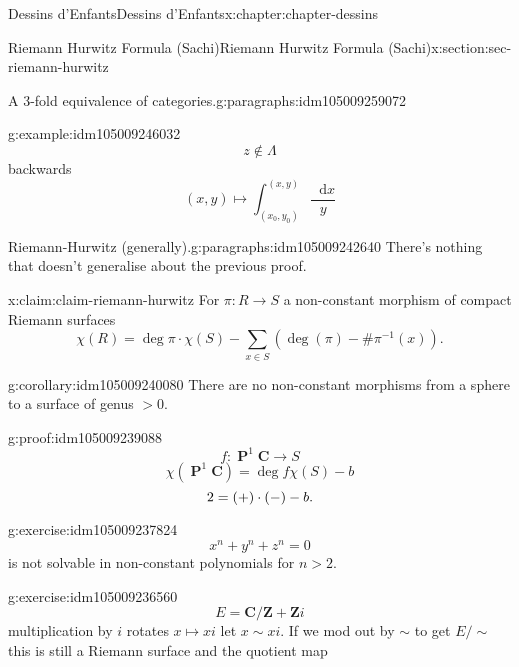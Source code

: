 \documentclass[oneside,10pt,]{book}
\newcommand{\qedhere}{\relax}
\numberwithin{equation}{section}
\newcommand{\diff}{\mathop{}\!\mathrm{d}}
\newcommand{\inv}{^{-1}}
\newcommand{\ZZ}{\mathbf{Z}}
\newcommand{\CC}{\mathbf{C}}
\DeclareMathOperator{\PP}{\mathbf{P}}
\newcommand{\gt}{>}
\begin{document}
\begin{chapterptx}{Dessins d'Enfants}{}{Dessins d'Enfants}{}{}{x:chapter:chapter-dessins}
\begin{sectionptx}{Riemann Hurwitz Formula (Sachi)}{}{Riemann Hurwitz Formula (Sachi)}{}{}{x:section:sec-riemann-hurwitz}
\begin{paragraphs}{A 3-fold equivalence of categories.}{g:paragraphs:idm105009259072}
\begin{example}{}{g:example:idm105009246032}
\begin{equation*}
\end{equation*}
%
\begin{equation*}
z\not\in \Lambda
\end{equation*}
backwards%
\begin{equation*}
(x,y) \mapsto \int_{(x_0, y_0)}^{(x,y)} \frac{\diff x}{y}
\end{equation*}
%
\end{example}
\end{paragraphs}%
\begin{paragraphs}{Riemann-Hurwitz (generally).}{g:paragraphs:idm105009242640}%
There's nothing that doesn't generalise about the previous proof.%
\begin{claim}{}{}{x:claim:claim-riemann-hurwitz}%
For \(\pi\colon R\to S\) a non-constant morphism of compact Riemann surfaces%
\begin{equation*}
\chi(R) = \deg \pi \cdot \chi(S)  - \sum_{x\in S} (\deg(\pi) - \#\pi\inv(x))\text{.}
\end{equation*}
%
\end{claim}
\begin{corollary}{}{}{g:corollary:idm105009240080}%
There are no non-constant morphisms from a sphere to a surface of genus \(\gt 0\).%
\end{corollary}
\begin{proofptx}{}{g:proof:idm105009239088}
%
\begin{equation*}
f\colon \PP^1 \CC \to S
\end{equation*}
%
\begin{equation*}
\chi(\PP^1 \CC) = \deg f \chi(S) - b
\end{equation*}
%
\begin{equation*}
2 = (+)\cdot (-) - b\text{.}\qedhere
\end{equation*}
%
\end{proofptx}
\begin{inlineexercise}{}{g:exercise:idm105009237824}%
%
\begin{equation*}
x^n  +y^ n + z^n = 0
\end{equation*}
is not solvable in non-constant polynomials for \(n \gt 2\).%
\end{inlineexercise}
\begin{inlineexercise}{}{g:exercise:idm105009236560}%
%
\begin{equation*}
E = \CC/ \ZZ + \ZZ i
\end{equation*}
multiplication by \(i\) rotates \(x \mapsto xi\) let \(x \sim xi\). If we mod out by \(\sim\) to get \(E/\sim\) this is still a Riemann surface and the quotient map%

\end{inlineexercise}
\end{paragraphs}
\end{sectionptx}
\end{chapterptx}
\end{document}
